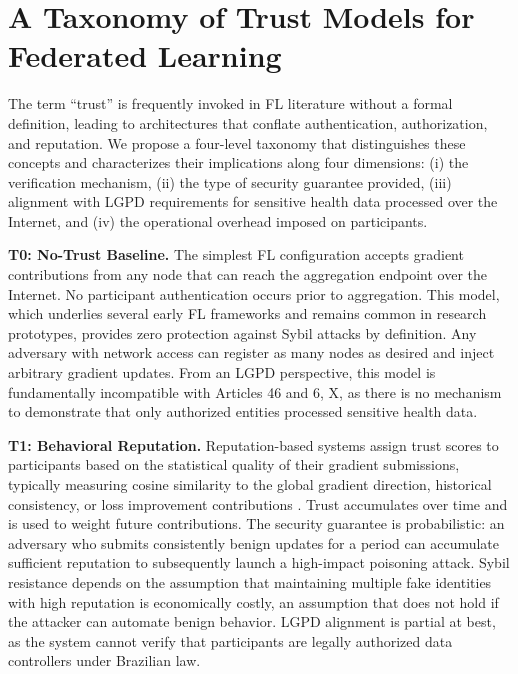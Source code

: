 \documentclass{sbc2023}
\begin{document}
\section{A Taxonomy of Trust Models for Federated Learning}
\label{sec:taxonomy}

The term ``trust'' is frequently invoked in FL literature without a formal definition, leading to architectures that conflate authentication, authorization, and reputation. We propose a four-level taxonomy that distinguishes these concepts and characterizes their implications along four dimensions: (i) the verification mechanism, (ii) the type of security guarantee provided, (iii) alignment with LGPD requirements for sensitive health data processed over the Internet, and (iv) the operational overhead imposed on participants.

\textbf{T0: No-Trust Baseline.} The simplest FL configuration accepts gradient contributions from any node that can reach the aggregation endpoint over the Internet. No participant authentication occurs prior to aggregation. This model, which underlies several early FL frameworks and remains common in research prototypes, provides zero protection against Sybil attacks by definition. Any adversary with network access can register as many nodes as desired and inject arbitrary gradient updates. From an LGPD perspective, this model is fundamentally incompatible with Articles 46 and 6, X, as there is no mechanism to demonstrate that only authorized entities processed sensitive health data.

\textbf{T1: Behavioral Reputation.} Reputation-based systems assign trust scores to participants based on the statistical quality of their gradient submissions, typically measuring cosine similarity to the global gradient direction, historical consistency, or loss improvement contributions \citep{10.1007/978-981-99-7032-2_3}. Trust accumulates over time and is used to weight future contributions. The security guarantee is probabilistic: an adversary who submits consistently benign updates for a period can accumulate sufficient reputation to subsequently launch a high-impact poisoning attack. Sybil resistance depends on the assumption that maintaining multiple fake identities with high reputation is economically costly, an assumption that does not hold if the attacker can automate benign behavior. LGPD alignment is partial at best, as the system cannot verify that participants are legally authorized data controllers under Brazilian law.
\end{document}
